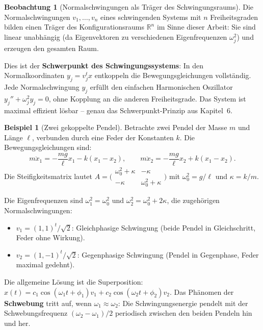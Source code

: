 ﻿\documentclass[a4paper,12pt]{report}
\theoremstyle{definition}
\newtheorem{beispiel}{Beispiel}
\newtheorem{beobachtung}{Beobachtung}
\begin{document}
\begin{beobachtung}[Normalschwingungen als Träger des Schwingungsraums]
    Die Normalschwingungen $v_1, \ldots, v_n$ eines schwingenden
    Systems mit $n$ Freiheitsgraden bilden einen Träger des
    Konfigurationsraums $\mathbb{R}^n$ im Sinne dieser Arbeit:
    Sie sind linear unabhängig (da Eigenvektoren zu verschiedenen
    Eigenfrequenzen $\omega_j^2$) und erzeugen den gesamten Raum.

    Dies ist der \textbf{Schwerpunkt des Schwingungssystems}: In den
    Normalkoordinaten $y_j = v_j^t x$ entkoppeln die Bewegungsgleichungen
    vollständig. Jede Normalschwingung $y_j$ erfüllt den einfachen
    Harmonischen Oszillator $y_j'' + \omega_j^2 y_j = 0$, ohne Kopplung
    an die anderen Freiheitsgrade. Das System ist maximal effizient
    lösbar -- genau das Schwerpunkt-Prinzip aus Kapitel~6.
\end{beobachtung}

\begin{beispiel}[Zwei gekoppelte Pendel]
    Betrachte zwei Pendel der Masse $m$ und Länge $\ell$, verbunden
    durch eine Feder der Konstanten $k$. Die Bewegungsgleichungen sind:
    \[
        m\ddot{x}_1 = -\frac{mg}{\ell}x_1 - k(x_1 - x_2), \qquad
        m\ddot{x}_2 = -\frac{mg}{\ell}x_2 + k(x_1 - x_2).
    \]
    Die Steifigkeitsmatrix lautet
    $A = \bigl(\begin{smallmatrix} \omega_0^2 + \kappa & -\kappa \\
    -\kappa & \omega_0^2 + \kappa \end{smallmatrix}\bigr)$
    mit $\omega_0^2 = g/\ell$ und $\kappa = k/m$.

    Die Eigenfrequenzen sind $\omega_1^2 = \omega_0^2$ und
    $\omega_2^2 = \omega_0^2 + 2\kappa$, die zugehörigen
    Normalschwingungen:
    \begin{itemize}
        \item[-] $v_1 = (1,1)^t/\sqrt{2}$: Gleichphasige Schwingung
              (beide Pendel in Gleichschritt, Feder ohne Wirkung).
        \item[-] $v_2 = (1,-1)^t/\sqrt{2}$: Gegenphasige Schwingung
              (Pendel in Gegenphase, Feder maximal gedehnt).
    \end{itemize}
    Die allgemeine Lösung ist die Superposition:
    $x(t) = c_1 \cos(\omega_1 t + \phi_1) v_1 + c_2 \cos(\omega_2 t + \phi_2) v_2$.
    Das Phänomen der \textbf{Schwebung} tritt auf, wenn $\omega_1 \approx \omega_2$:
    Die Schwingungsenergie pendelt mit der Schwebungsfrequenz
    $(\omega_2 - \omega_1)/2$ periodisch zwischen den beiden Pendeln hin und her.
\end{beispiel}
\end{document}

